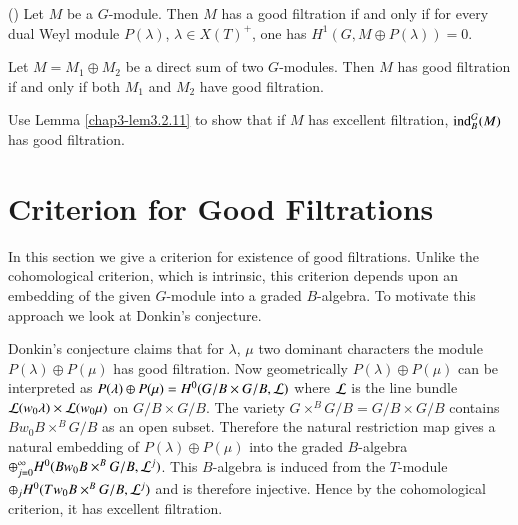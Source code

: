\begin{proposition}[Donkin]\label{chap4-prop4.1.5}
(\cite[II 4.16]{key11}) Let\pageoriginale 
  $M$\label{page35} be a $G$-module. Then $M$ has a good
  filtration if and only if for every dual Weyl 
module $P(\lambda)$,
  $\lambda\in X(T)^{+}$, one has $H^{1}(G,M\oplus P(\lambda))=0$.
\end{proposition}

\begin{corollary}\label{chap4-coro4.1.6}
Let $M=M_{1}\oplus M_{2}$ be a direct sum of two $G$-modules. Then $M$
has good filtration if and only if both $M_{1}$ and $M_{2}$ have good
filtration. 
\end{corollary}

\begin{exercise}\label{chap4-exer4.1.7}
Use Lemma \ref{chap3-lem3.2.11} to show that if $M$ has excellent
filtration, $\operatorname{ind}^{G}_{B}(M)$ has good filtration.
\end{exercise}

\section{Criterion for Good Filtrations}\label{chap4-sec4.2}

In this section we give a criterion for existence of good
filtrations. Unlike the cohomological criterion, which is intrinsic,
this criterion depends upon an embedding of the given $G$-module into
a graded $B$-alge\-bra. To motivate this approach we look at Donkin's
conjecture. 

\begin{remark}\label{chap4-rem4.2.1}
Donkin's conjecture claims that for $\lambda$, $\mu$ two dominant
characters the module $P(\lambda)\oplus P(\mu)$ has good
filtration. Now geometrically $P(\lambda)\oplus P(\mu)$ can be
interpreted as $P(\lambda)\oplus P(\mu)=H^{0}(G/B\times G/B,\mathcal{L})$ where
$\mathcal{L}$ is the line bundle $\mathcal{L}(w_{0}\lambda)\times \mathcal{L}(w_{0}\mu)$ on
$G/B\times G/B$. The variety $G\times^{B}G/B=G/B\times G/B$ contains
$Bw_{0}B\times^{B}G/B$ as an open subset. Therefore the natural
restriction map gives a natural embedding of $P(\lambda)\oplus P(\mu)$
into the graded $B$-algebra
$\oplus^{\infty}_{j=0}H^{0}(Bw_{0}B\times^{B}G/B,\mathcal{L}^{j})$. This
$B$-algebra is induced from the $T$-module
$\oplus_{j}H^{0}(Tw_{0}B\times^{B}G/B,\mathcal{L}^{j})$ and is therefore
injective. Hence by the cohomological criterion, it has excellent
filtration. 
\end{remark}

